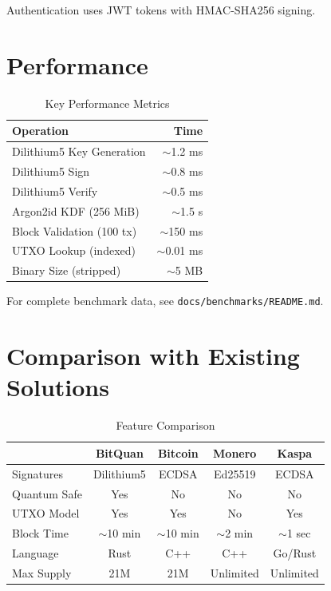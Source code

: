 \documentclass[11pt,a4paper]{article}
\begin{document}
Authentication uses JWT tokens with HMAC-SHA256 signing.

\section{Performance}

\begin{table}[H]
\centering
\caption{Key Performance Metrics}
\begin{tabular}{@{}lr@{}}
\toprule
\textbf{Operation} & \textbf{Time} \\
\midrule
Dilithium5 Key Generation & $\sim$1.2 ms \\
Dilithium5 Sign & $\sim$0.8 ms \\
Dilithium5 Verify & $\sim$0.5 ms \\
Argon2id KDF (256 MiB) & $\sim$1.5 s \\
Block Validation (100 tx) & $\sim$150 ms \\
UTXO Lookup (indexed) & $\sim$0.01 ms \\
Binary Size (stripped) & $\sim$5 MB \\
\bottomrule
\end{tabular}
\end{table}

For complete benchmark data, see \texttt{docs/benchmarks/README.md}.

\section{Comparison with Existing Solutions}

\begin{table}[H]
\centering
\caption{Feature Comparison}
\begin{tabular}{@{}lcccc@{}}
\toprule
& \textbf{BitQuan} & \textbf{Bitcoin} & \textbf{Monero} & \textbf{Kaspa} \\
\midrule
Signatures & Dilithium5 & ECDSA & Ed25519 & ECDSA \\
Quantum Safe & Yes & No & No & No \\
UTXO Model & Yes & Yes & No & Yes \\
Block Time & $\sim$10 min & $\sim$10 min & $\sim$2 min & $\sim$1 sec \\
Language & Rust & C++ & C++ & Go/Rust \\
Max Supply & 21M & 21M & Unlimited & Unlimited \\
\bottomrule
\end{tabular}
\end{table}
\end{document}
